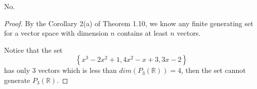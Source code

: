 \begin{Exercise}
\begin{answer}
No.
\end{answer}
\begin{proof}
By the Corollary 2(a) of Theorem 1.10, we know any finite generating set for a vector space with dimension $n$ contains at least $n$ vectors.

Notice that the set
$$
\left\{ x^3-2x^2+1,4x^2-x+3,3x-2 \right\}
$$
has only $3$ vectors which is less than $dim\left(P_3(\mathbb{R})\right) = 4$, then the set cannot generate $P_3(\mathbb{R})$. 
\end{proof}
\end{Exercise}